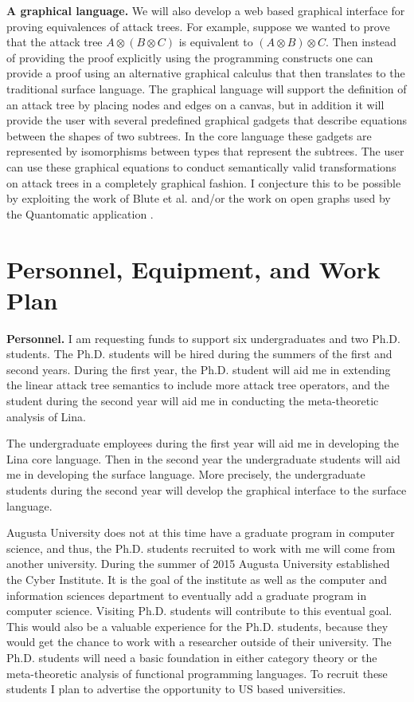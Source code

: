 \begin{full}
\textbf{A graphical language.} We will also develop a web based
graphical interface for proving equivalences of attack trees.  For
example, suppose we wanted to prove that the attack tree $A \otimes (B
\otimes C)$ is equivalent to $(A \otimes B) \otimes C$.  Then instead
of providing the proof explicitly using the programming constructs one
can provide a proof using an alternative graphical calculus that then
translates to the traditional surface language.  The graphical
language will support the definition of an attack tree by placing
nodes and edges on a canvas, but in addition it will provide the user
with several predefined graphical gadgets that describe equations
between the shapes of two subtrees.  In the core language these
gadgets are represented by isomorphisms between types that represent
the subtrees.  The user can use these graphical equations to conduct
semantically valid transformations on attack trees in a completely
graphical fashion.  I conjecture this to be possible by exploiting the
work of Blute et al. \cite{Blute:1996a} and/or the work on open graphs
used by the Quantomatic application \cite{Dixon:2011,Dixon:2010}.

\section{Personnel, Equipment, and Work Plan}
\label{sec:personnel_and_work_plan}
\textbf{Personnel.} I am requesting funds to support six
undergraduates and two Ph.D. students.  The Ph.D. students will be
hired during the summers of the first and second years.  During the
first year, the Ph.D. student will aid me in extending the linear
attack tree semantics to include more attack tree operators, and the
student during the second year will aid me in conducting the
meta-theoretic analysis of Lina.

The undergraduate employees during the first year will aid me in
developing the Lina core language.  Then in the second year the
undergraduate students will aid me in developing the surface language.
More precisely, the undergraduate students during the second year will
develop the graphical interface to the surface language.

Augusta University does not at this time have a graduate program in
computer science, and thus, the Ph.D. students recruited to work with
me will come from another university.  During the summer of 2015
Augusta University established the Cyber Institute.  It is the goal of
the institute as well as the computer and information sciences
department to eventually add a graduate program in computer science.
Visiting Ph.D. students will contribute to this eventual goal.  This
would also be a valuable experience for the Ph.D. students, because
they would get the chance to work with a researcher outside of their
university.  The Ph.D. students will need a basic foundation in either
category theory or the meta-theoretic analysis of functional
programming languages.  To recruit these students I plan to advertise
the opportunity to US based universities.


\end{full}
